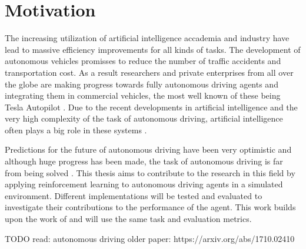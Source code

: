 \chapter{Motivation}
\label{cha:Motivation}

The increasing utilization of artificial intelligence accademia and industry have lead to massive efficiency improvements for all kinds of tasks. The development of autonomous vehicles promisses to reduce the number of traffic accidents and transportation cost. As a result researchers and private enterprises from all over the globe are making progress towards fully autonomous driving agents and integrating them in commercial vehicles, the most well known of these being Tesla Autopilot \autocite{tesla}. Due to the recent developments in artificial intelligence and the very high complexity of the task of autonomous driving, artificial intelligence often plays a big role in these systems \autocite{teslaEndToEnd}.

Predictions for the future of autonomous driving have been very optimistic and although huge progress has been made, the task of autonomous driving is far from being solved \autocite{state_of_autonomous_driving2023}. This thesis aims to contribute to the research in this field by applying reinforcement learning to autonomous driving agents in a simulated environment. Different implementations will be tested and  evaluated to investigate their contributions to the performance of the agent. This work builds upon the work of \textcite{maximilian} and will use the same task and evaluation metrics. %



TODO read:
autonomous driving older paper:
https://arxiv.org/abs/1710.02410



